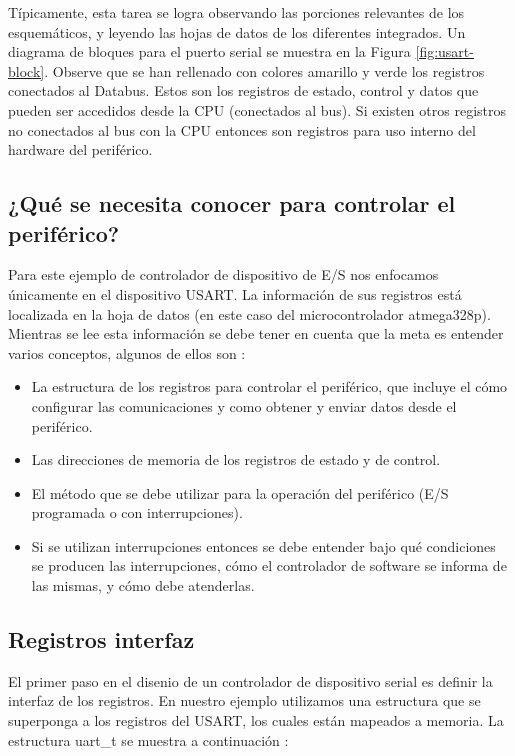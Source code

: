 \documentclass[output=paper, 
colorlinks,
citecolor=brown,
newtxmath
]{langscibook}
\begin{document}
Típicamente, esta tarea se logra  observando las porciones relevantes de los
esquemáticos, y leyendo las hojas de datos de los diferentes integrados.
Un diagrama de bloques para el puerto serial se muestra en la Figura \ref{fig:usart-block}.
Observe que se han rellenado con colores amarillo y verde los registros
conectados al Databus. Estos son los registros de estado, control y datos que
pueden ser accedidos desde la CPU (conectados al bus). Si existen otros 
registros no conectados al bus con la CPU entonces son registros para uso
interno del hardware del periférico.


\subsection*{¿Qué se necesita conocer para controlar el periférico?}
Para este ejemplo de controlador de dispositivo de E/S nos enfocamos únicamente
en el dispositivo USART. La información de sus registros está localizada en la hoja
de datos (en este caso del microcontrolador atmega328p). Mientras se lee esta información
se debe tener en cuenta que la meta es entender varios conceptos, algunos
de ellos son :
\begin{itemize}
\item La estructura de los registros para controlar el periférico, que incluye
el cómo configurar las comunicaciones y como obtener y enviar
datos desde el periférico.
\item Las direcciones de memoria de los registros de estado y de control.
\item El método que se debe utilizar para la operación del periférico (E/S 
programada o con interrupciones).
\item Si se utilizan interrupciones entonces se debe entender bajo qué condiciones
se producen las interrupciones, cómo el controlador de software se informa
de las mismas, y cómo debe atenderlas.
\end{itemize}

\subsection {Registros interfaz}

El primer paso en el disenio de un controlador de dispositivo serial es definir
la interfaz de los registros. En nuestro ejemplo utilizamos
una estructura que se superponga a los registros del USART, los cuales
están mapeados a memoria. La estructura uart\_t se muestra a continuación :
\end{document}
